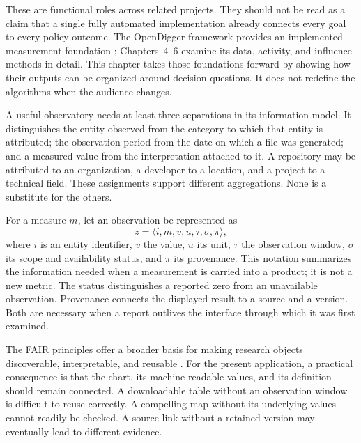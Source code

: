 These are functional roles across related projects. They should not be read as a claim that a single fully automated implementation already connects every goal to every policy outcome. The OpenDigger framework provides an implemented measurement foundation \citep{wang2026digger}; Chapters~4--6 examine its data, activity, and influence methods in detail. This chapter takes those foundations forward by showing how their outputs can be organized around decision questions. It does not redefine the algorithms when the audience changes.

A useful observatory needs at least three separations in its information model. It distinguishes the entity observed from the category to which that entity is attributed; the observation period from the date on which a file was generated; and a measured value from the interpretation attached to it. A repository may be attributed to an organization, a developer to a location, and a project to a technical field. These assignments support different aggregations. None is a substitute for the others.

For a measure \(m\), let an observation be represented as
\begin{equation}
z=\langle i,m,v,u,\tau,\sigma,\pi\rangle,
\label{eq:ch10-observation}
\end{equation}
where \(i\) is an entity identifier, \(v\) the value, \(u\) its unit, \(\tau\) the observation window, \(\sigma\) its scope and availability status, and \(\pi\) its provenance. This notation summarizes the information needed when a measurement is carried into a product; it is not a new metric. The status distinguishes a reported zero from an unavailable observation. Provenance connects the displayed result to a source and a version. Both are necessary when a report outlives the interface through which it was first examined.

The FAIR principles offer a broader basis for making research objects discoverable, interpretable, and reusable \citep{wilkinson2016}. For the present application, a practical consequence is that the chart, its machine-readable values, and its definition should remain connected. A downloadable table without an observation window is difficult to reuse correctly. A compelling map without its underlying values cannot readily be checked. A source link without a retained version may eventually lead to different evidence.

